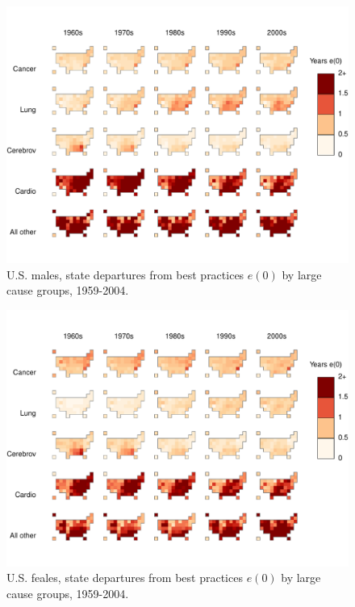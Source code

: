 \documentclass[11pt,oneside,a4paper]{article} %
\begin{document}
\begin{figure}
\centering
\caption{U.S. males, state departures from best practices $e(0)$ by large cause
groups, 1959-2004.}
\label{fig:depm}
\includegraphics[scale=0.7]{Figures/StatesDecadesM.pdf}
\end{figure}

\begin{figure}
\centering
\caption{U.S. feales, state departures from best practices $e(0)$ by large cause
groups, 1959-2004.}
\label{fig:depf}
\includegraphics[scale=0.7]{Figures/StatesDecadesF.pdf}
\end{figure}

\section*{}


\FloatBarrier


%
\end{document}

